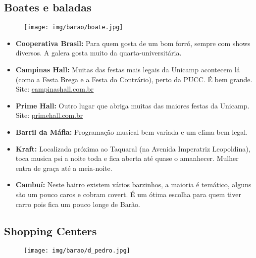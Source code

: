\subsection{Boates e baladas}

\begin{figure}[h!]
  \centering
  \texttt{[image: img/barao/boate.jpg]}
\end{figure}

\begin{itemize}
\item \textbf{Cooperativa Brasil:} Para quem gosta de um bom forró, sempre com
  shows diversos. A galera gosta muito da quarta-universitária.

\item \textbf{Campinas Hall:} Muitas das festas mais legais da Unicamp
  acontecem lá (como a Festa Brega e a Festa do Contrário), perto da PUCC. É
  bem grande.
  \\Site: \url{campinashall.com.br}

\item \textbf{Prime Hall:} Outro lugar que abriga muitas das maiores festas da
  Unicamp.
  \\Site: \url{primehall.com.br}

\item \textbf{Barril da Máfia:} Programação musical bem variada e um clima bem
  legal.

\item \textbf{Kraft:} Localizada próxima ao Taquaral (na Avenida Imperatriz
  Leopoldina), toca musica psi a noite toda e fica aberta até quase o
  amanhecer. Mulher entra de graça até a meia-noite.

\item \textbf{Cambuí:} Neste bairro existem vários barzinhos, a maioria é
  temático, alguns são um pouco caros e cobram covert. É um ótima escolha para
  quem tiver carro pois fica um pouco longe de Barão.
\end{itemize}

\subsection{Shopping Centers}

\begin{figure}[h!]
  \centering
  \texttt{[image: img/barao/d\_pedro.jpg]}
\end{figure}

